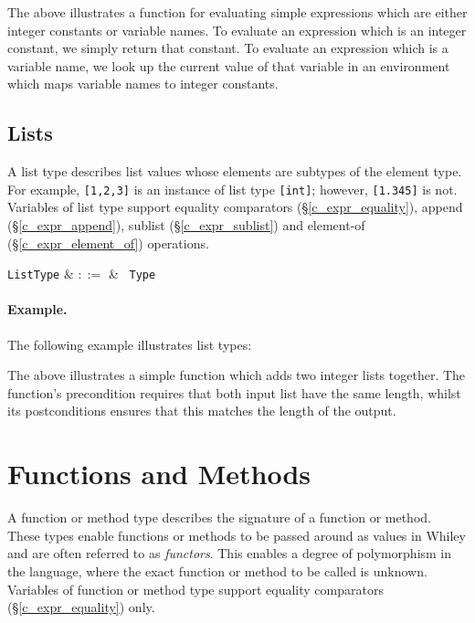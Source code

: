

The above illustrates a function for evaluating simple expressions which are either integer constants or variable names.  To evaluate an expression which is an integer constant, we simply return that constant.  To evaluate an expression which is a variable name, we look up the current value of that variable in an environment which maps variable names to integer constants.


\subsection{Lists}
\label{c_types_list}

A list type describes list values whose elements are subtypes of the element type. For example, \lstinline{[1,2,3]} is an instance of list type \lstinline{[int]}; however, \lstinline{[1.345]} is not.  Variables of list type support equality comparators (\S\ref{c_expr_equality}), append (\S\ref{c_expr_append}), sublist (\S\ref{c_expr_sublist}) and element-of (\S\ref{c_expr_element_of}) operations.

\begin{syntax}
  \verb+ListType+ & $::=$ & \token{[} \ \verb+Type+ \ \token{]}\\
\end{syntax}

\paragraph{Example.} The following example illustrates list types:



The above illustrates a simple function which adds two integer lists together.  The function's \gls{precondition} requires that both input list have the same length, whilst its \gls{postcondition}s ensures that this matches the length of the output.


\section{Functions and Methods}
A function or method type describes the signature of a function or method.  These types enable functions or methods to be passed around as values in Whiley and are often referred to as {\em functors}.  This enables a degree of polymorphism in the language, where the exact function or method to be called is unknown.   Variables of function or method type support equality comparators (\S\ref{c_expr_equality}) only.

